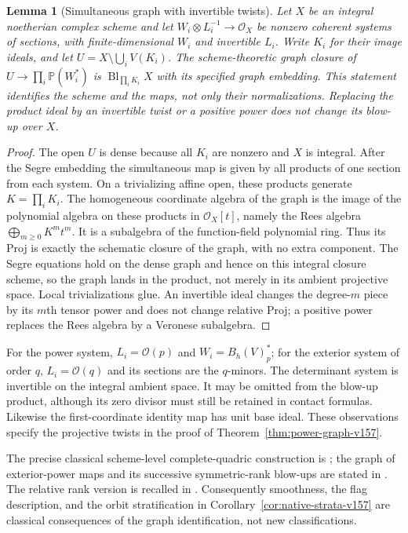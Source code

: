 \documentclass[11pt,reqno]{amsart}
\numberwithin{equation}{section}
\newtheorem{lemma}[theorem]{Lemma}
\theoremstyle{definition}\newtheorem{definition}[theorem]{Definition}
\theoremstyle{remark}\newtheorem{remark}[theorem]{Remark}
\newcommand{\Pj}{\mathbb P}\newcommand{\A}{\mathbb A}
\newcommand{\OO}{\mathcal O}\newcommand{\II}{\mathcal I}
\begin{document}
\begin{lemma}[Simultaneous graph with invertible twists]
\label{lem:simultaneous-graph-v158}
Let $X$ be an integral noetherian complex scheme and let
$W_i\otimes L_i^{-1}\to\OO_X$ be nonzero coherent systems of
sections, with finite-dimensional $W_i$ and invertible $L_i$.
Write $K_i$ for their image ideals, and let
$U=X\setminus\bigcup_i V(K_i)$. The scheme-theoretic graph closure
of $U\to\prod_i\Pj(W_i^*)$ is
$\operatorname{Bl}_{\prod_iK_i}X$ with its specified graph embedding.
This statement identifies the scheme and the maps, not only their
normalizations. Replacing the product ideal by an invertible twist
or a positive power does not change its blow-up over $X$.
\end{lemma}
\begin{proof}
The open $U$ is dense because all $K_i$ are nonzero and $X$ is integral.
After the Segre embedding the simultaneous map is given by all products
of one section from each system. On a trivializing affine open, these
products generate $K=\prod_iK_i$. The homogeneous coordinate algebra
of the graph is the image of the polynomial algebra on these
products in $\OO_X[t]$, namely the Rees algebra
$\bigoplus_{m\geq0}K^m t^m$. It is a subalgebra of the function-field
polynomial ring. Thus its Proj is exactly the schematic closure of
the graph, with no extra component. The Segre equations hold on the
dense graph and hence on this integral closure scheme, so the graph
lands in the product, not merely in its ambient projective space.
Local trivializations glue. An invertible ideal changes the degree-$m$
piece by its $m$th tensor power and does not change relative Proj;
a positive power replaces the Rees algebra by a Veronese subalgebra.
\end{proof}

For the power system, $L_i=\OO(p)$ and $W_i=B_h(V)_p^*$;
for the exterior system of order $q$, $L_i=\OO(q)$ and its sections
are the $q$-minors. The determinant system is invertible on the
integral ambient space. It may be omitted from the blow-up product,
although its zero divisor must still be retained in contact formulas.
Likewise the first-coordinate identity map has unit base ideal.
These observations specify the projective twists in the proof of
Theorem~\ref{thm:power-graph-v157}.

The precise classical scheme-level complete-quadric construction is
\cite[Theorem~6.3]{Vainsencher1982}; the graph of exterior-power maps
and its successive symmetric-rank blow-ups are stated in
\cite[Remark~2.5 and Construction~2.6]{Massarenti2020}.
The relative rank version is recalled in
\cite[Definition~2.5, Remark~2.6 and Theorem~2.14]{CasarottiCornianiMassarenti2023}.
Consequently smoothness, the flag description, and the orbit
stratification in Corollary~\ref{cor:native-strata-v157} are classical
consequences of the graph identification, not new classifications.
\end{document}
